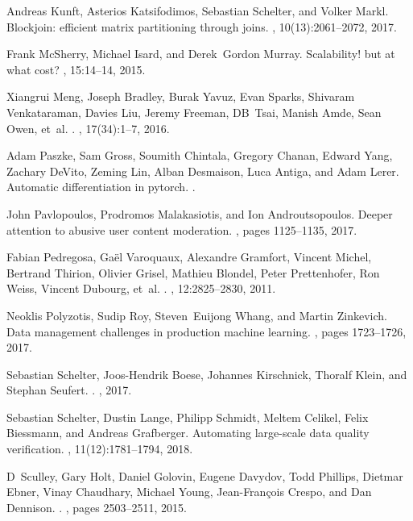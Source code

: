\documentclass[11pt]{article}
\begin{document}
\begin{thebibliography}{10}
Andreas Kunft, Asterios Katsifodimos, Sebastian Schelter, and Volker Markl.
\newblock Blockjoin: efficient matrix partitioning through joins.
, 10(13):2061--2072, 2017.

Frank McSherry, Michael Isard, and Derek~Gordon Murray.
\newblock Scalability! but at what cost?
, 15:14--14, 2015.

Xiangrui Meng, Joseph Bradley, Burak Yavuz, Evan Sparks, Shivaram Venkataraman,
  Davies Liu, Jeremy Freeman, DB~Tsai, Manish Amde, Sean Owen, et~al.
.
, 17(34):1--7, 2016.

Adam Paszke, Sam Gross, Soumith Chintala, Gregory Chanan, Edward Yang, Zachary
  DeVito, Zeming Lin, Alban Desmaison, Luca Antiga, and Adam Lerer.
\newblock Automatic differentiation in pytorch.
.

John Pavlopoulos, Prodromos Malakasiotis, and Ion Androutsopoulos.
\newblock Deeper attention to abusive user content moderation.
, pages 1125--1135, 2017.

Fabian Pedregosa, Ga{\"e}l Varoquaux, Alexandre Gramfort, Vincent Michel,
  Bertrand Thirion, Olivier Grisel, Mathieu Blondel, Peter Prettenhofer, Ron
  Weiss, Vincent Dubourg, et~al.
.
, 12:2825--2830, 2011.

Neoklis Polyzotis, Sudip Roy, Steven~Euijong Whang, and Martin Zinkevich.
\newblock Data management challenges in production machine learning.
, pages 1723--1726, 2017.

Sebastian Schelter, Joos-Hendrik Boese, Johannes Kirschnick, Thoralf Klein, and
  Stephan Seufert.
.
, 2017.

Sebastian Schelter, Dustin Lange, Philipp Schmidt, Meltem Celikel, Felix
  Biessmann, and Andreas Grafberger.
\newblock Automating large-scale data quality verification.
, 11(12):1781--1794, 2018.

D~Sculley, Gary Holt, Daniel Golovin, Eugene Davydov, Todd Phillips, Dietmar
  Ebner, Vinay Chaudhary, Michael Young, Jean-Fran{\c{c}}ois Crespo, and Dan
  Dennison.
.
, pages 2503--2511, 2015.


\end{thebibliography}
\end{document}
